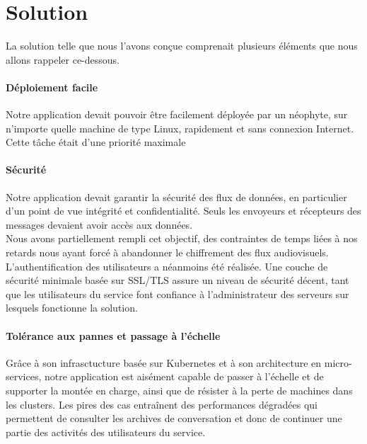 \section{Solution}

La solution telle que nous l'avons conçue comprenait plusieurs éléments que nous allons rappeler ce-dessous.

\paragraph{Déploiement facile} Notre application devait pouvoir être facilement déployée par un néophyte, sur n'importe quelle machine de type Linux, rapidement et sans connexion Internet. Cette tâche était d'une priorité maximale%

\paragraph{Sécurité} Notre application devait garantir la sécurité des flux de données, en particulier d'un point de vue intégrité et confidentialité. Seuls les envoyeurs et récepteurs des messages devaient avoir accès aux données.\\
Nous avons partiellement rempli cet objectif, des contraintes de temps liées à nos retards nous ayant forcé à abandonner le chiffrement des flux audiovisuels. L'authentification des utilisateurs a néanmoins été réalisée. Une couche de sécurité minimale basée sur SSL/TLS assure un niveau de sécurité décent, tant que les utilisateurs du service font confiance à l'administrateur des serveurs sur lesquels fonctionne la solution.

\paragraph{Tolérance aux pannes et passage à l'échelle} Grâce à son infrasctucture basée sur Kubernetes et à son architecture en micro-services, notre application est aisément capable de passer à l'échelle et de supporter la montée en charge, ainsi que de résister à la perte de machines dans les clusters. Les pires des cas entraînent des performances dégradées qui permettent de consulter les archives de conversation et donc de continuer une partie des activités des utilisateurs du service. %

